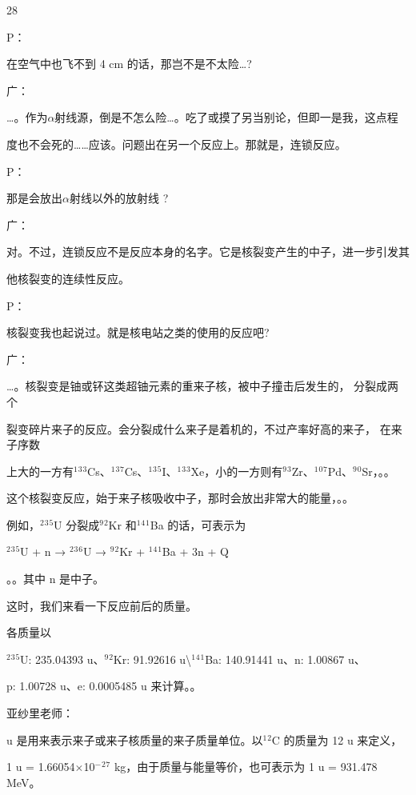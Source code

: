 28\par
P：\par
在空气中也飞不到 4 cm 的话，那岂不是不太险…?\par
广：\par
…。作为$\alpha$射线源，倒是不怎么险…。吃了或摸了另当别论，但即一是我，这点程\par
度也不会死的……应该。问题出在另一个反应上。那就是，连锁反应。\par
P：\par
那是会放出$\alpha$射线以外的放射线 ?\par
广：\par
对。不过，连锁反应不是反应本身的名字。它是核裂变产生的中子，进一步引发其\par
他核裂变的连续性反应。\par
P：\par
核裂变我也起说过。就是核电站之类的使用的反应吧?\par
广：\par
…。核裂变是铀或钚这类超铀元素的重来子核，被中子撞击后发生的， 分裂成两个\par
裂变碎片来子的反应。会分裂成什么来子是着机的，不过产率好高的来子， 在来子序数\par
上大的一方有$^{1}$$^{3}$$^{3}$Cs、$^{1}$$^{3}$$^{7}$Cs、$^{1}$$^{3}$$^{5}$I、$^{1}$$^{3}$$^{3}$Xe，小的一方则有$^{9}$$^{3}$Zr、$^{1}$$^{0}$$^{7}$Pd、$^{9}$$^{0}$Sr，。。\par
这个核裂变反应，始于来子核吸收中子，那时会放出非常大的能量，。。\par
例如，$^{2}$$^{3}$$^{5}$U 分裂成$^{9}$$^{2}$Kr 和$^{1}$$^{4}$$^{1}$Ba 的话，可表示为\par
$^{2}$$^{3}$$^{5}$U + n → $^{2}$$^{3}$$^{6}$U → $^{9}$$^{2}$Kr + $^{1}$$^{4}$$^{1}$Ba + 3n + Q\par
。。其中 n 是中子。\par
这时，我们来看一下反应前后的质量。\par
各质量以\par
$^{2}$$^{3}$$^{5}$U: 235.04393 u、$^{9}$$^{2}$Kr: 91.92616 u\textbackslash{}$^{1}$$^{4}$$^{1}$Ba: 140.91441 u、n: 1.00867 u、\par
p: 1.00728 u、e: 0.0005485 u 来计算。。\par
亚纱里老师：\par
u 是用来表示来子或来子核质量的来子质量单位。以$^{1}$$^{2}$C 的质量为 12 u 来定义，\par
1 u = 1.66054$\times$10$^{-}$$^{2}$$^{7}$ kg，由于质量与能量等价，也可表示为 1 u = 931.478 MeV。\par

